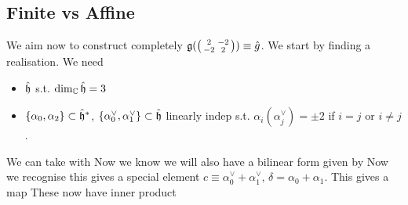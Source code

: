 \documentclass{article}
\begin{document}
\subsection{Finite vs Affine}
We aim now to construct completely $\mathfrak{g}(\begin{psmallmatrix} 2 & -2 \\ -2 & 2 \end{psmallmatrix}) \equiv \hat{g}$. We start by finding a realisation. We need 
\begin{itemize}
    \item $\hat{\mathfrak{h}}$ s.t. $\dim_{\mathbb{C}} \hat{\mathfrak{h}} = 3$
    \item $\left\{ \alpha_0, \alpha_2 \right\} \subset \hat{\mathfrak{h}}^\ast$, $\left\{ \alpha_0^\vee, \alpha_1^\vee \right\} \subset \hat{\mathfrak{h}}$ linearly indep s.t. $\alpha_i(\alpha_j^\vee) = \pm 2$ if $i=j$ or $i \neq j$. 
\end{itemize}
We can take 
with 
Now we know we will also have a bilinear form given by 
Now we recognise this gives a special element $c \equiv \alpha_0^\vee + \alpha_1^\vee, \, \delta = \alpha_0 + \alpha_1$. This gives a map 
These now have inner product 
\end{document}

